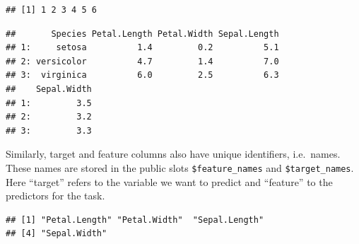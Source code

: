 \documentclass[]{article}
\newenvironment{Shaded}{\begin{snugshade}}{\end{snugshade}}
\newcommand{\CommentTok}[1]{\textcolor[rgb]{0.56,0.35,0.01}{\textit{#1}}}
\newcommand{\DataTypeTok}[1]{\textcolor[rgb]{0.13,0.29,0.53}{#1}}
\newcommand{\DecValTok}[1]{\textcolor[rgb]{0.00,0.00,0.81}{#1}}
\newcommand{\KeywordTok}[1]{\textcolor[rgb]{0.13,0.29,0.53}{\textbf{#1}}}
\newcommand{\NormalTok}[1]{#1}
\newcommand{\OperatorTok}[1]{\textcolor[rgb]{0.81,0.36,0.00}{\textbf{#1}}}
\renewenvironment{Shaded} {\begin{snugshade}\small} {\end{snugshade}}
\begin{document}
\begin{Shaded}
\end{Shaded}

\begin{verbatim}
## [1] 1 2 3 4 5 6
\end{verbatim}

\begin{Shaded}
\end{Shaded}

\begin{verbatim}
##       Species Petal.Length Petal.Width Sepal.Length
## 1:     setosa          1.4         0.2          5.1
## 2: versicolor          4.7         1.4          7.0
## 3:  virginica          6.0         2.5          6.3
##    Sepal.Width
## 1:         3.5
## 2:         3.2
## 3:         3.3
\end{verbatim}

Similarly, target and feature columns also have unique identifiers, i.e.~names.
These names are stored in the public slots \texttt{\$feature\_names} and \texttt{\$target\_names}.
Here ``target'' refers to the variable we want to predict and ``feature'' to the predictors for the task.

\begin{Shaded}
\end{Shaded}

\begin{verbatim}
## [1] "Petal.Length" "Petal.Width"  "Sepal.Length"
## [4] "Sepal.Width"
\end{verbatim}

\begin{Shaded}
\end{Shaded}
\end{document}
